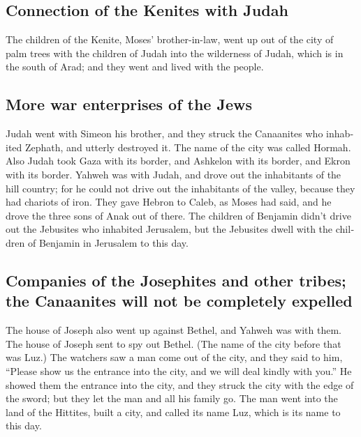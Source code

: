 \begin{paracol}{2}
\begin{otherlanguage}{english}
\hypertarget{connection-of-the-kenites-with-judah}{%
\subsection{Connection of the Kenites with
Judah}\label{connection-of-the-kenites-with-judah}}

 The children of the Kenite, Moses' brother-in-law, went
up out of the city of palm trees with the children of Judah into the
wilderness of Judah, which is in the south of Arad; and they went and
lived with the people.

\hypertarget{more-war-enterprises-of-the-jews}{%
\subsection{More war enterprises of the
Jews}\label{more-war-enterprises-of-the-jews}}

 Judah went with Simeon his brother, and they struck the
Canaanites who inhabited Zephath, and utterly destroyed it. The name of
the city was called Hormah.  Also Judah took Gaza with
its border, and Ashkelon with its border, and Ekron with its border.
 Yahweh was with Judah, and drove out the inhabitants of
the hill country; for he could not drive out the inhabitants of the
valley, because they had chariots of iron.  They gave
Hebron to Caleb, as Moses had said, and he drove the three sons of Anak
out of there.  The children of Benjamin didn't drive out
the Jebusites who inhabited Jerusalem, but the Jebusites dwell with the
children of Benjamin in Jerusalem to this day.

\hypertarget{companies-of-the-josephites-and-other-tribes-the-canaanites-will-not-be-completely-expelled}{%
\subsection{Companies of the Josephites and other tribes; the Canaanites
will not be completely
expelled}\label{companies-of-the-josephites-and-other-tribes-the-canaanites-will-not-be-completely-expelled}}

 The house of Joseph also went up against Bethel, and
Yahweh was with them.  The house of Joseph sent to spy
out Bethel. (The name of the city before that was Luz.) 
The watchers saw a man come out of the city, and they said to him,
``Please show us the entrance into the city, and we will deal kindly
with you.''  He showed them the entrance into the city,
and they struck the city with the edge of the sword; but they let the
man and all his family go.  The man went into the land of
the Hittites, built a city, and called its name Luz, which is its name
to this day.


\end{otherlanguage}
\end{paracol}
